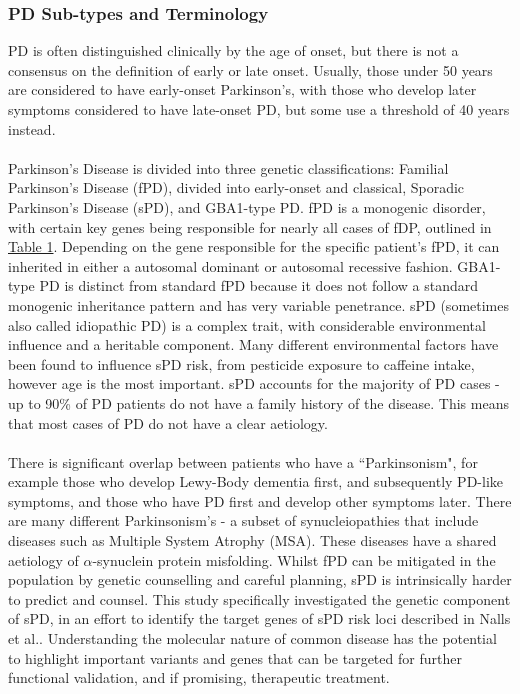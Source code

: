 \documentclass{article}
\begin{document}
\subsubsection{PD Sub-types and Terminology}
\label{subsubsec:PDtypes}
PD is often distinguished clinically by the age of onset, but there is not a consensus on the definition of early or late onset\cite{Riboldi2022AParkinsonism}. Usually, those under 50 years are considered to have early-onset Parkinson's, with those who develop later symptoms considered to have late-onset PD, but some use a threshold of 40 years instead\cite{Ferguson2016Early-onsetStudy}.
\\
\\Parkinson's Disease is divided into three genetic classifications: Familial Parkinson's Disease (fPD), divided into early-onset and classical, Sporadic Parkinson's Disease (sPD), and GBA1-type PD\cite{Tolosa2021ChallengesDisease}. fPD is a monogenic disorder, with certain key genes being responsible for nearly all cases of fDP, outlined in \hyperref[tab:fPDgenes]{Table 1}. Depending on the gene responsible for the specific patient's fPD, it can inherited in either a autosomal dominant or autosomal recessive fashion\cite{Day2021ThePractice}. GBA1-type PD is distinct from standard fPD because it does not follow a standard monogenic inheritance pattern and has very variable penetrance. sPD (sometimes also called idiopathic PD) is a complex trait, with considerable environmental influence and a heritable component\cite{Nalls2019IdentificationStudies}. Many different environmental factors have been found to influence sPD risk\cite{Costa2023ParkinsonsDisorder}, from pesticide exposure to caffeine intake, however age is the most important. sPD accounts for the majority of PD cases - up to 90\% of PD patients do not have a family history of the disease\cite{Inamdar2007ParkinsonsBeyond}. This means that most cases of PD do not have a clear aetiology. 
\\
\\There is significant overlap between patients who have a ``Parkinsonism", for example those who develop Lewy-Body dementia first, and subsequently PD-like symptoms\cite{Jellinger2018DementiaControversies}, and those who have PD first and develop other symptoms later. There are many different Parkinsonism's - a subset of synucleiopathies that include diseases such as Multiple System Atrophy (MSA)\cite{Hayes2019ParkinsonsParkinsonism}. These diseases have a shared aetiology of $\alpha$-synuclein protein misfolding. Whilst fPD can be mitigated in the population by genetic counselling and careful planning, sPD is intrinsically harder to predict and counsel. This study specifically investigated the genetic component of sPD, in an effort to identify the target genes of sPD risk loci described in Nalls et al.\cite{Nalls2019IdentificationStudies}. Understanding the molecular nature of common disease has the potential to highlight important variants and genes that can be targeted for further functional validation, and if promising, therapeutic treatment.
\end{document}
